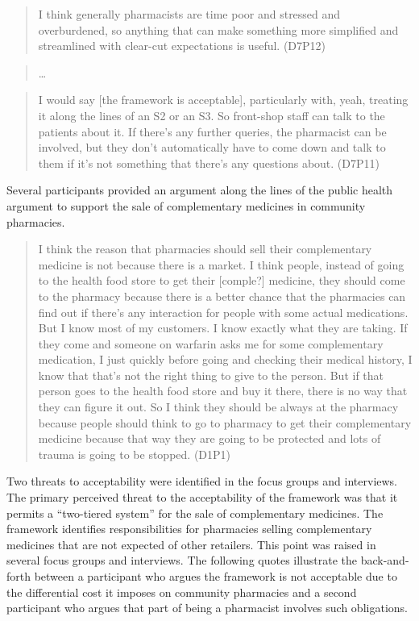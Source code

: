\documentclass[11pt,a4paper]{article}
\begin{document}
\begin{quote}
I think generally pharmacists are time poor and stressed and
overburdened, so anything that can make something more simplified and
streamlined with clear-cut expectations is useful. (D7P12)
\end{quote}

\begin{quote}
\ldots{}
\end{quote}

\begin{quote}
I would say {[}the framework is acceptable{]}, particularly with, yeah,
treating it along the lines of an S2 or an S3. So front-shop staff can
talk to the patients about it. If there's any further queries, the
pharmacist can be involved, but they don't automatically have to come
down and talk to them if it's not something that there's any questions
about. (D7P11)
\end{quote}

Several participants provided an argument along the lines of the public
health argument to support the sale of complementary medicines in
community pharmacies.

\begin{quote}
I think the reason that pharmacies should sell their complementary
medicine is not because there is a market. I think people, instead of
going to the health food store to get their {[}comple?{]} medicine, they
should come to the pharmacy because there is a better chance that the
pharmacies can find out if there's any interaction for people with some
actual medications. But I know most of my customers. I know exactly what
they are taking. If they come and someone on warfarin asks me for some
complementary medication, I just quickly before going and checking their
medical history, I know that that's not the right thing to give to the
person. But if that person goes to the health food store and buy it
there, there is no way that they can figure it out. So I think they
should be always at the pharmacy because people should think to go to
pharmacy to get their complementary medicine because that way they are
going to be protected and lots of trauma is going to be stopped. (D1P1)
\end{quote}

Two threats to acceptability were identified in the focus groups and
interviews. The primary perceived threat to the acceptability of the
framework was that it permits a ``two-tiered system'' for the sale of
complementary medicines. The framework identifies responsibilities for
pharmacies selling complementary medicines that are not expected of
other retailers. This point was raised in several focus groups and
interviews. The following quotes illustrate the back-and-forth between a
participant who argues the framework is not acceptable due to the
differential cost it imposes on community pharmacies and a second
participant who argues that part of being a pharmacist involves such
obligations.
\end{document}
